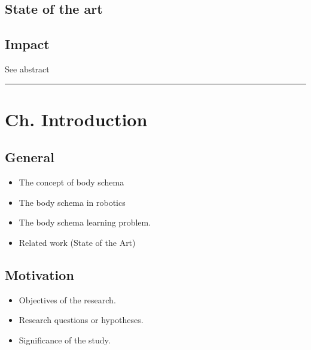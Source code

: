\documentclass[12pt, a4paper]{article}
\begin{document}
\subsection*{State of the art}

\subsection*{Impact}
See abstract

\rule{\textwidth}{0.4pt}

\section*{Ch. Introduction}

\subsection*{General}
\begin{itemize}
	\item The concept of body schema
	\item The body schema in robotics
	\item The body schema learning problem.
	\item Related work (State of the Art)

\end{itemize}

\subsection*{Motivation}
\begin{itemize}
	\item Objectives of the research.
	\item Research questions or hypotheses.
	\item Significance of the study.
\end{itemize}
\end{document}
